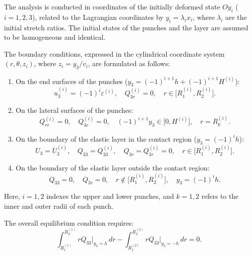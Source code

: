The analysis is conducted in coordinates of the initially deformed state \( Oy_i \) (\( i = 1,2,3 \)), related to the Lagrangian coordinates by \( y_i = \lambda_i x_i \), where \( \lambda_i \) are the initial stretch ratios. The initial states of the punches and the layer are assumed to be homogeneous and identical.

The boundary conditions, expressed in the cylindrical coordinate system \( (r, \theta, z_i) \), where \( z_i = y_3 / v_i \), are formulated as follows:

\begin{enumerate}
	\item On the end surfaces of the punches (\( y_3 = (-1)^{i+1} h + (-1)^{i+1} H^{(i)} \)):
	\begin{equation} \label{YaretskaEq4.1.1}
		u_3^{(i)} = (-1)^i \varepsilon^{(i)}, \quad Q_{3r}^{(i)} = 0, \quad r \in \big[R_1^{(i)}, R_2^{(i)}\big].
	\end{equation}
	
	\item On the lateral surfaces of the punches:
	\begin{equation} \label{YaretskaEq4.1.2}
		Q_{rr}^{(i)} = 0, \quad Q_{3r}^{(i)} = 0, \quad (-1)^{i+1} y_3 \in \big[0, H^{(i)}\big], \quad r = R_k^{(i)}.
	\end{equation}
	
	\item On the boundary of the elastic layer in the contact region (\( y_3 = (-1)^i h \)):
	\begin{equation} \label{YaretskaEq4.1.3}
		U_3 = U_3^{(i)}, \quad Q_{33} = Q_{33}^{(i)}, \quad Q_{3r} = Q_{3r}^{(i)} = 0, \quad r \in \big[R_1^{(i)}, R_2^{(i)}\big].
	\end{equation}
	
	\item On the boundary of the elastic layer outside the contact region:
	\begin{equation} \label{YaretskaEq4.1.4}
		Q_{33} = 0, \quad Q_{3r} = 0, \quad r \notin \big[R_1^{(i)}, R_2^{(i)}\big], \quad y_3 = (-1)^i h.
	\end{equation}
\end{enumerate}
Here, \( i = 1,2 \) indexes the upper and lower punches, and \( k = 1,2 \) refers to the inner and outer radii of each punch.

The overall equilibrium condition requires:
\begin{equation} \label{YaretskaEq4.1.5}
	\int_{R_1^{(1)}}^{R_2^{(1)}} r Q_{33} \big|_{y_3 = h} \, dr
	- \int_{R_1^{(2)}}^{R_2^{(2)}} r Q_{33} \big|_{y_3 = -h} \, dr = 0.
\end{equation}

